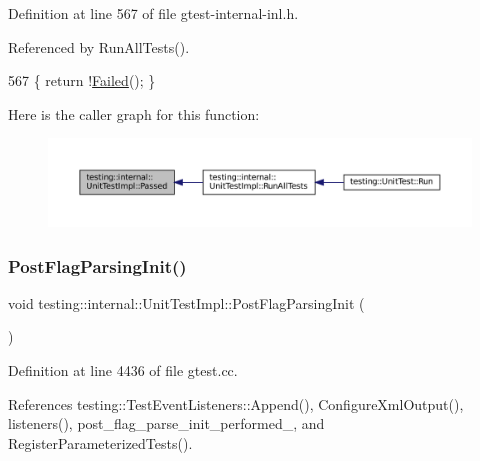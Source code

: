 Definition at line 567 of file gtest-\/internal-\/inl.\+h.



Referenced by Run\+All\+Tests().


\begin{DoxyCode}
567 \{ \textcolor{keywordflow}{return} !\hyperlink{classtesting_1_1internal_1_1UnitTestImpl_a0c95d1b56b5f33057afc516db05ac313}{Failed}(); \}
\end{DoxyCode}
Here is the caller graph for this function\+:
\nopagebreak
\begin{figure}[H]
\begin{center}
\leavevmode
\includegraphics[width=350pt]{classtesting_1_1internal_1_1UnitTestImpl_ae8e461369acfec902da382bc02297fe5_icgraph}
\end{center}
\end{figure}
\mbox{\label{classtesting_1_1internal_1_1UnitTestImpl_a772894193104b1b2516f16e6ff813168}} 
\subsubsection{\texorpdfstring{Post\+Flag\+Parsing\+Init()}{PostFlagParsingInit()}}
{\footnotesize\ttfamily void testing\+::internal\+::\+Unit\+Test\+Impl\+::\+Post\+Flag\+Parsing\+Init (\begin{DoxyParamCaption}{ }\end{DoxyParamCaption})}



Definition at line 4436 of file gtest.\+cc.



References testing\+::\+Test\+Event\+Listeners\+::\+Append(), Configure\+Xml\+Output(), listeners(), post\+\_\+flag\+\_\+parse\+\_\+init\+\_\+performed\+\_\+, and Register\+Parameterized\+Tests().



